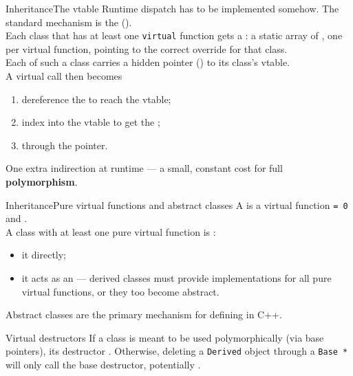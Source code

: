 \begin{frame}{Inheritance}{The vtable}
	\justifying
	Runtime dispatch has to be implemented somehow. The standard mechanism is the  ().\\
	\bigskip
	Each class that has at least one \texttt{virtual} function gets a : a static array of , one per virtual function, pointing to the correct override for that class.\\
	\bigskip
	Each  of such a class carries a hidden pointer () to its class's vtable.\\
	\bigskip
	A virtual call then becomes
	\begin{enumerate}
		\item dereference the  to reach the vtable;
		\item index into the vtable to get the ;
		\item {} through the pointer.
	\end{enumerate}
	\bigskip
	\begin{block}{}
		\centering
		One extra indirection at runtime — a small, constant cost for full \textbf{polymorphism}.
	\end{block}
\end{frame}
\begin{frame}{Inheritance}{Pure virtual functions and abstract classes}
	\justifying
	A  is a virtual function  \texttt{= 0} and .\\
	\bigskip
	A class with at least one pure virtual function is :
	\begin{itemize}
		\item it  directly;
		\item it acts as an  — derived classes must provide implementations for all pure virtual functions, or they too become abstract.
	\end{itemize}
	\bigskip
	Abstract classes are the primary mechanism for defining  in C++.\\
	\bigskip
	\begin{alertblock}{Virtual destructors}
		\justifying
		If a class is meant to be used polymorphically (via base pointers), its destructor .
		Otherwise, deleting a \texttt{Derived} object through a \texttt{Base *} will only call the base destructor, potentially .
	\end{alertblock}
\end{frame}
